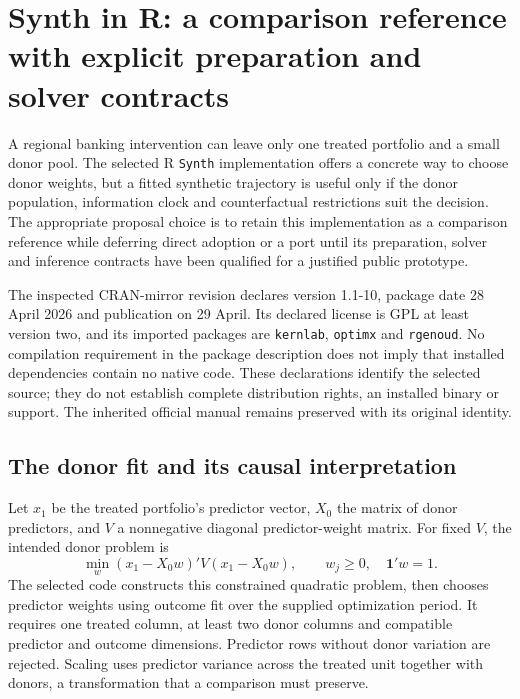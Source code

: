 \section{Synth in R: a comparison reference with explicit preparation and solver contracts}
\label{sec:exec24-synth-reuse}

A regional banking intervention can leave only one treated portfolio and a
small donor pool. The selected R \texttt{Synth} implementation offers a
concrete way to choose donor weights, but a fitted synthetic trajectory is
useful only if the donor population, information clock and counterfactual
restrictions suit the decision. The appropriate proposal choice is to retain
this implementation as a comparison reference while deferring direct adoption
or a port until its preparation, solver and inference contracts have been
qualified for a justified public prototype.
\citep{exec24_synth_choice}

The inspected CRAN-mirror revision declares version 1.1-10, package date
28 April 2026 and publication on 29 April. Its declared license is
GPL at least version two, and its imported packages are \texttt{kernlab},
\texttt{optimx} and \texttt{rgenoud}. No compilation requirement in the
package description does not imply that installed dependencies contain
no native code. These declarations identify the selected source; they do
not establish complete distribution rights, an installed binary or support.
The inherited official manual remains preserved with its original identity.
\citep{exec24_synth_source,v12_sw_synth}

\subsection{The donor fit and its causal interpretation}
Let $x_1$ be the treated portfolio's predictor vector, $X_0$ the matrix of
donor predictors, and $V$ a nonnegative diagonal predictor-weight matrix.
For fixed $V$, the intended donor problem is
\[
 \min_w (x_1-X_0w)'V(x_1-X_0w),
 \qquad w_j\geq0,\quad \mathbf{1}'w=1.
\]
The selected code constructs this constrained quadratic problem, then
chooses predictor weights using outcome fit over the supplied optimization
period. It requires one treated column, at least two donor columns and
compatible predictor and outcome dimensions. Predictor rows without donor
variation are rejected. Scaling uses predictor variance across the treated
unit together with donors, a transformation that a comparison must preserve.
\citep{exec24_synth_source,v12_sw_synth}

